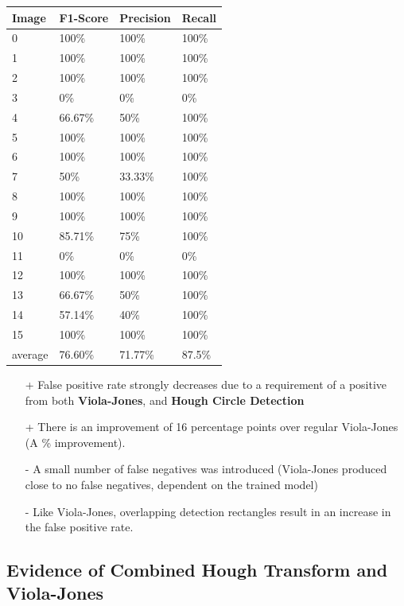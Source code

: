 \documentclass[conference]{IEEEtran}
\begin{document}
\begin{center}
	\begin{tabular}{| l | l | l | l |}
		\hline
		Image & F1-Score & Precision & Recall \\ \hline
		0 & 100\% & 100\% & 100\% \\ \hline
		1 & 100\% & 100\% & 100\% \\ \hline
		2 & 100\% & 100\% & 100\% \\ \hline
		3 &  0\% & 0\% & 0\% \\ \hline
		4 & 66.67\% & 50\% & 100\% \\ \hline
		5 & 100\% & 100\% & 100\% \\ \hline
		6 & 100\%  & 100\% & 100\% \\ \hline
		7 & 50\% & 33.33\% & 100\%\\ \hline
		8 & 100\% & 100\% & 100\% \\ \hline
		9 & 100\% & 100\% & 100\% \\ \hline
		10 & 85.71\% & 75\% & 100\% \\ \hline
		11 & 0\% & 0\% & 0\% \\ \hline
		12 & 100\% & 100\% & 100\% \\ \hline
		13 & 66.67\% & 50\% & 100\% \\ \hline
		14 & 57.14\% & 40\% & 100\% \\ \hline
		15 & 100\% & 100\% & 100\%\\ \hline
		average & 76.60\% & 71.77\% & 87.5\% \\ \hline
	\end{tabular}
\end{center}

\begin{itemize}
	\item[+] False positive rate strongly decreases due to a requirement of a positive from both \textbf{Viola-Jones}, and \textbf{Hough Circle Detection}
	\item[+] There is an improvement of 16 percentage points over regular Viola-Jones (A \% improvement).
	\item[-] A small number of false negatives was introduced (Viola-Jones produced close to no false negatives, dependent on the trained model)
	\item[-] Like Viola-Jones, overlapping detection rectangles result in an increase in the false positive rate.
\end{itemize}

\subsection{Evidence of Combined Hough Transform and Viola-Jones}
\end{document}
